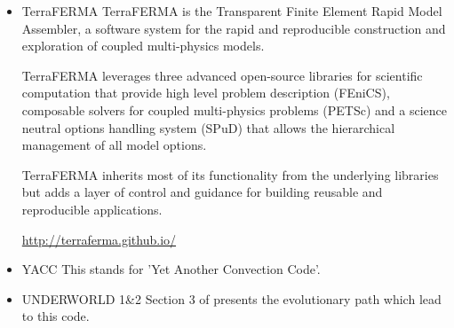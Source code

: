\begin{itemize}
\cite{wegg15}


\item {\codefont TerraFERMA} 
TerraFERMA is the Transparent Finite Element Rapid Model Assembler, a software system for the rapid and reproducible construction and exploration of coupled multi-physics models.

TerraFERMA leverages three advanced open-source libraries for scientific computation that provide high level problem description (FEniCS), composable solvers for coupled multi-physics problems (PETSc) and a science neutral options handling system (SPuD) that allows the hierarchical management of all model options.

TerraFERMA inherits most of its functionality from the underlying libraries but adds a layer of control and guidance for building reusable and reproducible applications.

\url{http://terraferma.github.io/}

{\small
\noindent
\cite{wisv14}
\cite{wisv17}
\cite{spmw16}
\cite{ceww17}
\cite{ceww19}
}

\item {\codefont YACC} 
This stands for 'Yet Another Convection Code'.

{\small
\noindent
\cite{sato12}
\cite{toyd13}
\cite{tosn15}
\cite{tomy16}
}

\item {\codefont UNDERWORLD 1\&2} 
Section 3 of \cite{qums07} presents the evolutionary path which lead to this code.


\end{itemize}
